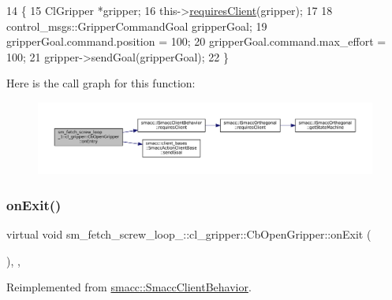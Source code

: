 \begin{DoxyCode}
14     \{
15         ClGripper *gripper;
16         this->\hyperlink{classsmacc_1_1ISmaccClientBehavior_a32b16e99e3b4cb289414203dc861a440}{requiresClient}(gripper);
17 
18         control\_msgs::GripperCommandGoal gripperGoal;
19         gripperGoal.command.position = 100;
20         gripperGoal.command.max\_effort = 100;
21         gripper->sendGoal(gripperGoal);
22     \}
\end{DoxyCode}
Here is the call graph for this function\+:
\nopagebreak
\begin{figure}[H]
\begin{center}
\leavevmode
\includegraphics[width=350pt]{classsm__fetch__screw__loop__1_1_1cl__gripper_1_1CbOpenGripper_a2d50cf912c699839eda7c15a490e0b9f_cgraph}
\end{center}
\end{figure}
\mbox{\label{classsm__fetch__screw__loop__1_1_1cl__gripper_1_1CbOpenGripper_aef1b4dc2e4a1044d17a22fa59bcc845e}} 
\subsubsection{\texorpdfstring{on\+Exit()}{onExit()}}
{\footnotesize\ttfamily virtual void sm\+\_\+fetch\+\_\+screw\+\_\+loop\+\_\+::cl\+\_\+gripper\+::\+Cb\+Open\+Gripper\+::on\+Exit (\begin{DoxyParamCaption}{ }\end{DoxyParamCaption})\hspace{0.3cm}{\ttfamily [inline]}, {\ttfamily [override]}, {\ttfamily [virtual]}}



Reimplemented from \hyperlink{classsmacc_1_1SmaccClientBehavior_a7e4fb6ce81ff96dc172425852d69c0c5}{smacc\+::\+Smacc\+Client\+Behavior}.



